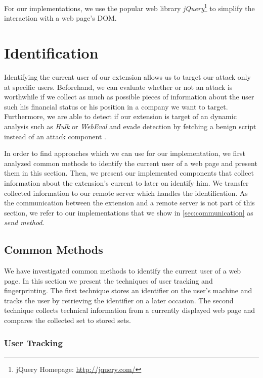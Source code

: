	For our implementations, we use the popular web library \textit{jQuery}\footnote{jQuery Homepage: \url{http://jquery.com/}} to simplify the interaction with a web page's DOM. 

\newpage	
\section{Identification}
\label{sec:identification} 

	Identifying the current user of our extension allows us to target our attack only at specific users. Beforehand, we can evaluate whether or not an attack is worthwhile if we collect as much as possible pieces of information about the user such his financial status or his position in a company we want to target. Furthermore, we are able to detect if our extension is target of an dynamic analysis such as \textit{Hulk} or \textit{WebEval} and evade detection by fetching a benign script instead of an attack component \cite{184485,190984}.
	
	In order to find approaches which we can use for our implementation, we first analyzed common methods to identify the current user of a web page and present them in this section. Then, we present our implemented components that collect information about the extension's current to later on identify him. We transfer collected information to our remote server which handles the identification. As the communication between the extension and a remote server is not part of this section, we refer to our implementations that we show in \autoref{sec:communication} as \textit{send method}.
	
\subsection{Common Methods}

	We have investigated common methods to identify the current user of a web page. In this section we present the techniques of user tracking and fingerprinting. The first technique stores an identifier on the user's machine and tracks the user by retrieving the identifier on a later occasion. The second technique collects technical information from a currently displayed web page and compares the collected set to stored sets.
	
\subsubsection{User Tracking}
\label{sec:userTracking}

